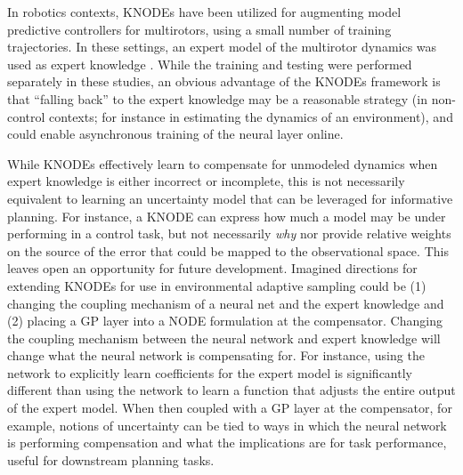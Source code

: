 In robotics contexts, KNODEs have been utilized for augmenting model predictive controllers for multirotors, using a small number of training trajectories. In these settings, an expert model of the multirotor dynamics was used as expert knowledge \autocite{chee2022knode}. While the training and testing were performed separately in these studies, an obvious advantage of the KNODEs framework is that ``falling back'' to the expert knowledge may be a reasonable strategy (in non-control contexts; for instance in estimating the dynamics of an environment), and could enable asynchronous training of the neural layer online. 

While KNODEs effectively learn to compensate for unmodeled dynamics when expert knowledge is either incorrect or incomplete, this is not necessarily equivalent to learning an uncertainty model that can be leveraged for informative planning. For instance, a KNODE can express how much a model may be under performing in a control task, but not necessarily \emph{why} nor provide relative weights on the source of the error that could be mapped to the observational space. This leaves open an opportunity for future development. Imagined directions for extending KNODEs for use in environmental adaptive sampling could be (1) changing the coupling mechanism of a neural net and the expert knowledge and (2) placing a GP layer into a NODE formulation at the compensator. Changing the coupling mechanism between the neural network and expert knowledge will change what the neural network is compensating for. For instance, using the network to explicitly learn coefficients for the expert model is significantly different than using the network to learn a function that adjusts the entire output of the expert model. When then coupled with a GP layer at the compensator, for example, notions of uncertainty can be tied to ways in which the neural network is performing compensation and what the implications are for task performance, useful for downstream planning tasks. 




